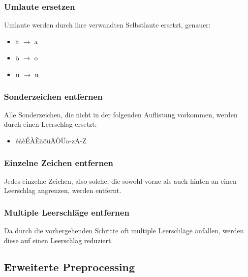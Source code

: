 \subsubsection{Umlaute ersetzen}
Umlaute werden durch ihre verwandten Selbstlaute ersetzt, genauer:
\begin{itemize}
	\item ä $\rightarrow$ a
	\item ö $\rightarrow$ o
	\item ü $\rightarrow$ u
\end{itemize} 
\subsubsection{Sonderzeichen entfernen}
Alle Sonderzeichen, die nicht in der folgenden Auflistung vorkommen, werden durch einen Leerschlag ersetzt:
\begin{itemize}
	\item éàèÉÀÈäöüÄÖÜa-zA-Z
\end{itemize} 
\subsubsection{Einzelne Zeichen entfernen}
Jedes einzelne Zeichen, also solche, die sowohl vorne als auch hinten an einen Leerschlag angrenzen, werden entfernt.
\subsubsection{Multiple Leerschläge entfernen}
Da durch die vorhergehenden Schritte oft multiple Leerschläge anfallen, werden diese auf einen Leerschlag reduziert.
\subsection{Erweiterte Preprocessing}
